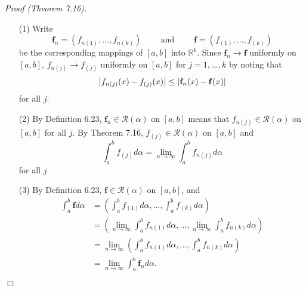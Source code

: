 \documentclass{article}
\begin{document}
\emph{Proof (Theorem 7.16).}
\begin{enumerate}
\item[(1)]
  Write
  \[
    \mathbf{f}_n = \left(f_{n(1)}, \ldots, f_{n(k)}\right)
    \qquad
    \text{ and }
    \qquad
    \mathbf{f} = \left(f_{(1)}, \ldots, f_{(k)}\right)
  \]
  be the corresponding mappings of $[a,b]$ into $\mathbb{R}^k$.
  Since $\mathbf{f}_n \to \mathbf{f}$ uniformly on $[a,b]$,
  $f_{n(j)} \to f_{(j)}$ uniformly on $[a,b]$ for $j = 1,\ldots,k$
  by noting that
  \[
    \abs{ f_{n(j)}(x) - f_{(j)}(x) }
    \leq
    \abs{ \mathbf{f}_n(x) - \mathbf{f}(x) }
  \]
  for all $j$.

\item[(2)]
  By Definition 6.23,
  $\mathbf{f}_n \in \mathscr{R}(\alpha)$ on $[a,b]$
  means that
  $f_{n(j)} \in \mathscr{R}(\alpha)$ on $[a,b]$ for all $j$.
  By Theorem 7.16, $f_{(j)} \in \mathscr{R}(\alpha)$ on $[a,b]$ and
  \[
    \int_{a}^{b} f_{(j)} d\alpha
    = \lim_{n \to \infty} \int_{a}^{b} f_{n(j)} d\alpha
  \]
  for all $j$.

\item[(3)]
  By Definition 6.23, $\mathbf{f} \in \mathscr{R}(\alpha)$ on $[a,b]$, and
  \begin{align*}
    \int_{a}^{b} \mathbf{f} d\alpha
    &= \left(
        \int_{a}^{b} f_{(1)} d\alpha,
        \ldots,
        \int_{a}^{b} f_{(k)} d\alpha
      \right) \\
    &= \left(
        \lim_{n \to \infty} \int_{a}^{b} f_{n(1)} d\alpha,
        \ldots,
        \lim_{n \to \infty} \int_{a}^{b} f_{n(k)} d\alpha
      \right) \\
    &= \lim_{n \to \infty} \left(
        \int_{a}^{b} f_{n(1)} d\alpha,
        \ldots,
        \int_{a}^{b} f_{n(k)} d\alpha
      \right) \\
    &= \lim_{n \to \infty} \int_{a}^{b} \mathbf{f}_n d\alpha.
  \end{align*}
\end{enumerate}
$\Box$ \\
\end{document}
